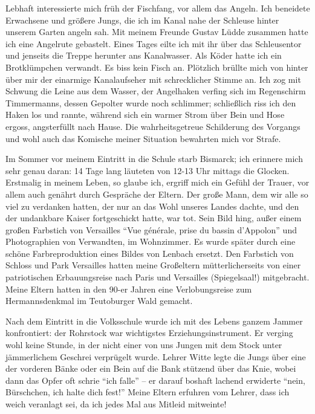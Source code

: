 \documentclass[a5paper,pagesize,10pt,twoside=true]{scrbook}
\begin{document}
Lebhaft interessierte mich früh der Fischfang, vor allem das Angeln. Ich beneidete Erwachsene und größere Jungs, die ich im Kanal nahe der Schleuse hinter unserem Garten angeln sah. Mit meinem Freunde Gustav Lüdde zusammen hatte ich eine Angelrute gebastelt. Eines Tages eilte ich mit ihr über das Schleusentor und jenseits die Treppe herunter ans Kanalwasser. Als Köder hatte ich ein Brotklümpchen verwandt. Es biss kein Fisch an. Plötzlich brüllte mich von hinter über mir der einarmige Kanalaufseher mit schrecklicher Stimme an. Ich zog mit Schwung die Leine aus dem Wasser, der Angelhaken verfing sich im Regenschirm Timmermanns, dessen Gepolter wurde noch schlimmer; schließlich riss ich den Haken los und rannte, während sich ein warmer Strom über Bein und Hose ergoss, angsterfüllt nach Hause. Die wahrheitsgetreue Schilderung des Vorgangs und wohl auch das Komische meiner Situation bewahrten mich vor Strafe.

Im Sommer vor meinem Eintritt in die Schule starb Bismarck; ich erinnere mich sehr genau daran: 14 Tage lang läuteten von 12-13 Uhr mittags die Glocken. Erstmalig in meinem Leben, so glaube ich, ergriff mich ein Gefühl der Trauer, vor allem auch genährt durch Gespräche der Eltern. Der große Mann, dem wir alle so viel zu verdanken hatten, der nur an das Wohl unseres Landes dachte, und den der undankbare Kaiser fortgeschickt hatte, war tot. Sein Bild hing, außer einem großen Farbstich von Versailles \enquote{Vue générale, prise du bassin d'Appolon} und Photographien von Verwandten, im Wohnzimmer. Es wurde später durch eine schöne Farbreproduktion eines Bildes von Lenbach ersetzt. Den Farbstich von Schloss und Park Versailles hatten meine Großeltern mütterlicherseits von einer patriotischen Erbauungsreise nach Paris und Versailles (Spiegelsaal!) mitgebracht. Meine Eltern hatten in den 90-er Jahren eine Verlobungsreise zum Hermannsdenkmal im Teutoburger Wald gemacht.

Nach dem Eintritt in die Volksschule wurde ich mit des Lebens ganzem Jammer konfrontiert: der Rohrstock war wichtigstes Erziehungsinstrument. Er verging wohl keine Stunde, in der nicht einer von uns Jungen mit dem Stock unter jämmerlichem Geschrei verprügelt wurde. Lehrer Witte legte die Jungs über eine der vorderen Bänke oder ein Bein auf die Bank stützend über das Knie, wobei dann das Opfer oft schrie \enquote{ich falle} -- er darauf boshaft lachend erwiderte \enquote{nein, Bürschchen, ich halte dich fest!} Meine Eltern erfuhren vom Lehrer, dass ich weich veranlagt sei, da ich jedes Mal aus Mitleid mitweinte!
\end{document}

